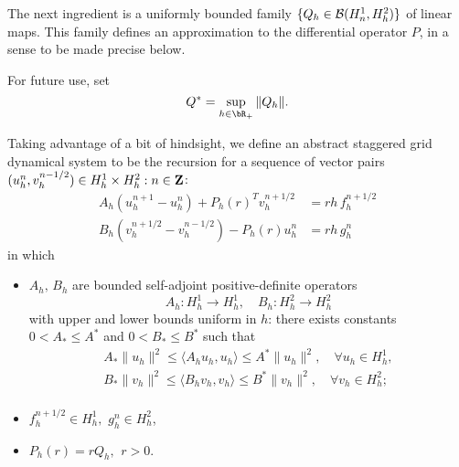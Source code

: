 The next ingredient is a uniformly bounded family $\{Q_h \in {\cal
  B}(H^1_n,H^2_h)\}$ of linear maps. This family defines an 
approximation to the differential operator $P$, in a sense to be made
precise below. 

For future use, set
\[
Q^* = \sup_{h \in \bR_+} \|Q_h\|.
\]

Taking advantage of a bit of hindsight, we define an abstract staggered grid
dynamical system to be the recursion for a sequence of vector pairs $(u^n_h,v^{n-1/2}_h)
\in H^1_h \times H^2_h: n \in {\bf Z}$:
\begin{equation}\label{eq:sg}
\begin{split}
	A_h(u^{n+1}_h - u^n_h)  + P_h(r)^T v^{n+1/2}_h &= rh\,   f_h^{n+1/2} \\
	B_h(v^{n+1/2}_h-v^{n-1/2}_h) -  P_h(r) u^n_h &=  rh\, g_h^{n} 
\end{split}
\end{equation}
in which
\begin{itemize} 

	\item $A_h, \, B_h$ are bounded self-adjoint positive-definite operators 
\[
	A_h: H_h^1 \rightarrow H_h^1,\quad B_h: H_h^2 \rightarrow H_h^2
\]
with upper and lower bounds uniform in $h$: there exists constants $0<A_*\le A^*$ and $0<B_*\le B^*$ such that
\begin{equation*}
\begin{split}
	A_*\|u_h\|^2 \le \langle A_h u_h,u_h \rangle \le A^*\|u_h\|^2, 
	\quad \forall u_h\in H_h^1, \\
	B_*\|v_h\|^2 \le \langle B_h v_h,v_h \rangle \le B^*\|v_h\|^2,
	\quad \forall v_h\in H_h^2; \\
\end{split}
\end{equation*}
\item $f_h^{n+1/2} \in H^1_h,\,\, g_h^{n} \in H^2_h$,
\item $P_h(r) = rQ_h, \,\ r > 0$.
\end{itemize}

